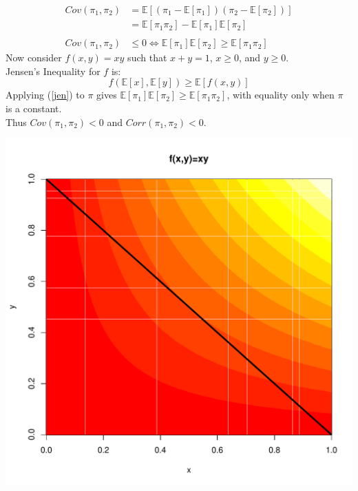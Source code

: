 \documentclass[ xcolor = pdftex, dvipsnames, table ]{beamer}
\begin{document}
\begin{frame}
	\begin{minipage}{0.69\textwidth}
	\begin{align*}
	Cov(\pi_{1}, \pi_{2}) &= \mathbb{E}[(\pi_{1}-\mathbb{E}[\pi_{1}])(\pi_{2}-\mathbb{E}[\pi_{2}])] \nonumber\\ 
        &= \mathbb{E}[\pi_{1}\pi_{2}] - \mathbb{E}[\pi_{1}]\mathbb{E}[\pi_{2}] \nonumber\\\nonumber\\
        Cov(\pi_{1}, \pi_{2}) &\le0 \iff \mathbb{E}[\pi_{1}]\mathbb{E}[\pi_{2}] \ge \mathbb{E}[\pi_{1}\pi_{2}]
	\end{align*}
	Now consider $f(x, y)=xy$ such that $x+y=1$, $x\ge0$, and $y\ge0$.\\
	Jensen's Inequality for $f$ is: 
	\begin{equation}
	f(\mathbb{E}[x], \mathbb{E}[y]) \ge \mathbb{E}[f(x, y)]
	\label{jen}
	\end{equation}
	Applying (\ref{jen}) to $\pi$ gives $\mathbb{E}[\pi_{1}]\mathbb{E}[\pi_{2}] \ge \mathbb{E}[\pi_{1}\pi_{2}]$, 
	with equality only when $\pi$ is a constant.
	\\
	Thus $Cov(\pi_{1}, \pi_{2}) < 0$ and $Corr(\pi_{1}, \pi_{2}) < 0$.
	\end{minipage}
	\begin{minipage}{0.29\textwidth}
	\hspace*{0.5cm}
	\includegraphics[width=\textwidth]{./pictures/heatPlot.pdf}\\

\end{minipage}
\end{frame}
\end{document}
